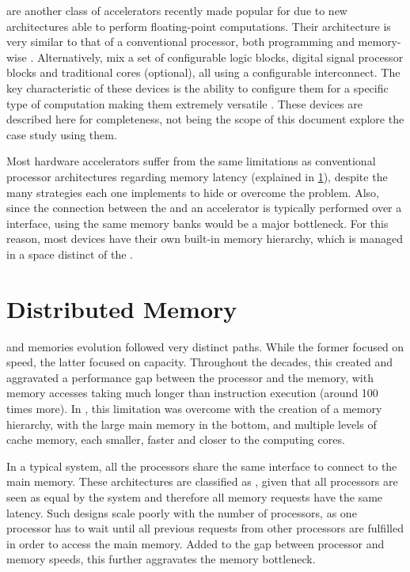 \documentclass[../thesis]{subfiles}
\begin{document}
		\dsps are another class of accelerators recently made popular for \hpc due to new architectures able to perform floating-point computations. Their architecture is very similar to that of a conventional processor, both programming and memory-wise \cite{FLAWN61}. Alternatively, \fpgas mix a set of configurable logic blocks, digital signal processor blocks and traditional \cpu cores (optional), all using a configurable interconnect. The key characteristic of these devices is the ability to configure them for a specific type of computation making them extremely versatile \cite{Brodtkorb:2010}. These devices are described here for completeness, not being the scope of this document explore the case study using them.

		Most hardware accelerators suffer from the same limitations as conventional processor architectures regarding memory latency (explained in \cref{sec:techbg:distmem}), despite the many strategies each one implements to hide or overcome the problem. Also, since the connection between the \cpu and an accelerator is typically performed over a \pcie interface, using the same memory banks would be a major bottleneck. For this reason, most devices have their own built-in memory hierarchy, which is managed in a space distinct of the \cpus.


		\section{Distributed Memory}
		\label{sec:techbg:distmem}

		\cpus and memories evolution followed very distinct paths. While the former focused on speed, the latter focused on capacity. Throughout the decades, this created and aggravated a performance gap between the processor and the memory, with memory accesses taking much longer than instruction execution (around 100 times more). In \cpus, this limitation was overcome with the creation of a memory hierarchy, with the large main memory in the bottom, and multiple levels of cache memory, each smaller, faster and closer to the computing cores.

		In a typical \smp system, all the processors share the same interface to connect to the main memory. These architectures are classified as \uma, given that all processors are seen as equal by the system and therefore all memory requests have the same latency. Such designs scale poorly with the number of processors, as one processor has to wait until all previous requests from other processors are fulfilled in order to access the main memory. Added to the gap between processor and memory speeds, this further aggravates the memory bottleneck.
\end{document}
